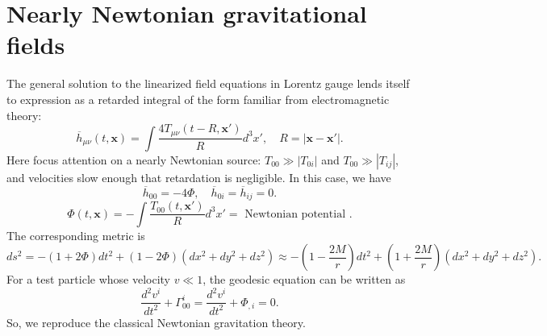 \documentclass[cyan]{elegantnote}
\begin{document}
\section{Nearly Newtonian gravitational fields}
The general solution to the linearized field equations in Lorentz gauge lends itself to expression as a retarded integral of the form familiar from electromagnetic theory:
\[\overline{h}_{\mu\nu}(t,\bm{x}) = \int \frac{4T_{\mu\nu}(t-R,\bm{x}')}{R} d^3x' , \quad R = |\bm{x}-\bm{x}'|.\]
Here focus attention on a nearly Newtonian source: $T_{00} \gg |T_{0i}|$ and $T_{00} \gg |T_{ij}|$, and velocities
slow enough that retardation is negligible. In this case, we have
\[\overline{h}_{00} = -4\Phi , \quad \overline{h}_{0i} = \overline{h}_{ij} = 0.\]
\[\Phi(t,\bm{x}) = -\int \frac{T_{00}(t,\bm{x}')}{R} d^3x' = \mbox{ Newtonian potential }.\]
The corresponding metric is
\[ds^2 = -(1+2\Phi)dt^2 + (1-2\Phi)(dx^2 + dy^2 + dz^2) \approx -(1-\frac{2M}{r})dt^2 + (1+\frac{2M}{r})(dx^2 + dy^2 + dz^2).\]
For a test particle whose velocity $v \ll 1$, the geodesic equation can be written as
\[\frac{d^2 v^i}{dt^2} + \Gamma^{i}_{00} = \frac{d^2 v^i}{dt^2} + \Phi_{,i} = 0.\]
So, we reproduce the classical Newtonian gravitation theory.
\end{document}
